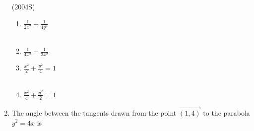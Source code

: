 \documentclass[journal,12pt,twocolumn]{IEEEtran}
\theoremstyle{remark}
\begin{document}
\begin{enumerate}
\hfill{(2004S)}
\begin{multicols}{2}
\begin{enumerate}
    \item $\frac{1}{2x^{2}}+\frac{1}{4y^{2}}$ \\\\
    \item $\frac{1}{4x^{2}}+\frac{1}{2x^{2}}$ 
    \item $\frac{x^{2}}{2}+\frac{y^{2}}{4}=1$ \\\\
    \item $\frac{x^{2}}{4}+\frac{y^{2}}{2}=1$ 
\end{enumerate}
\end{multicols}
\item The angle between the tangents drawn from the point $\vec{(1,4)}$ to the parabola $y^{2}=4x$ is 


\end{enumerate}
\end{document}
